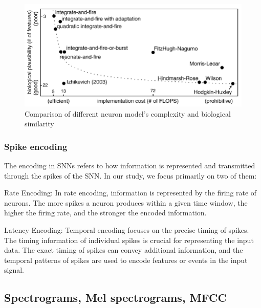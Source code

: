 \documentclass[11pt]{article}
\begin{document}
\begin{enumerate}
        \begin{figure}[h]
          \centering
          \begin{minipage}{0.9\textwidth}
            \centering
            \includegraphics[width=1\textwidth]{"image/comparison_neuron.png"}
            \caption{Comparison of different neuron model's complexity and biological similarity}
            \label{fig:neuron_comparison}
          \end{minipage}\hfill
        \end{figure}
\end{enumerate}


\subsubsection{Spike encoding}

The encoding in SNNs refers to how information is represented and transmitted through the spikes of the SNN. In our study, we focus primarily on two of them:

Rate Encoding:
In rate encoding, information is represented by the firing rate of neurons. The more spikes a neuron produces within a given time window, the higher the firing rate, and the stronger the encoded information.


Latency Encoding:
Temporal encoding focuses on the precise timing of spikes. The timing information of individual spikes is crucial for representing the input data.
The exact timing of spikes can convey additional information, and the temporal patterns of spikes are used to encode features or events in the input signal.




\subsection{Spectrograms, Mel spectrograms, MFCC}
\end{document}
